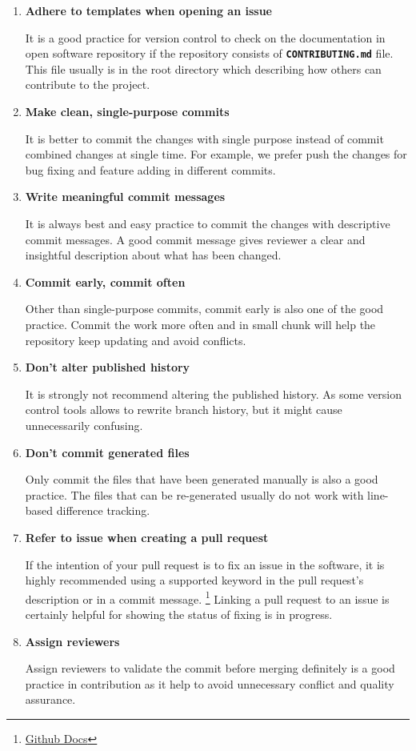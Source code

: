 \documentclass[
  letterpaper,
  DIV=11,
  numbers=noendperiod]{scrreport}
\begin{document}
\begin{enumerate}
\def\labelenumi{\arabic{enumi}.}
\item
  \textbf{Adhere to templates when opening an issue}

  It is a good practice for version control to check on the
  documentation in open software repository if the repository consists
  of \textbf{\texttt{CONTRIBUTING.md}} file. This file usually is in the
  root directory which describing how others can contribute to the
  project.
\item
  \textbf{Make clean, single-purpose commits}

  It is better to commit the changes with single purpose instead of
  commit combined changes at single time. For example, we prefer push
  the changes for bug fixing and feature adding in different commits.
\item
  \textbf{Write meaningful commit messages}

  It is always best and easy practice to commit the changes with
  descriptive commit messages. A good commit message gives reviewer a
  clear and insightful description about what has been changed.
\item
  \textbf{Commit early, commit often}

  Other than single-purpose commits, commit early is also one of the
  good practice. Commit the work more often and in small chunk will help
  the repository keep updating and avoid conflicts.
\item
  \textbf{Don't alter published history}

  It is strongly not recommend altering the published history. As some
  version control tools allows to rewrite branch history, but it might
  cause unnecessarily confusing.
\item
  \textbf{Don't commit generated files}

  Only commit the files that have been generated manually is also a good
  practice. The files that can be re-generated usually do not work with
  line-based difference tracking.
\item
  \textbf{Refer to issue when creating a pull request}

  If the intention of your pull request is to fix an issue in the
  software, it is highly recommended using a supported keyword in the
  pull request's description or in a commit message. \footnote{\href{https://docs.github.com/en/issues/tracking-your-work-with-issues/linking-a-pull-request-to-an-issue}{Github
    Docs}} Linking a pull request to an issue is certainly helpful for
  showing the status of fixing is in progress.
\item
  \textbf{Assign reviewers}

  Assign reviewers to validate the commit before merging definitely is a
  good practice in contribution as it help to avoid unnecessary conflict
  and quality assurance.
\end{enumerate}
\end{document}
